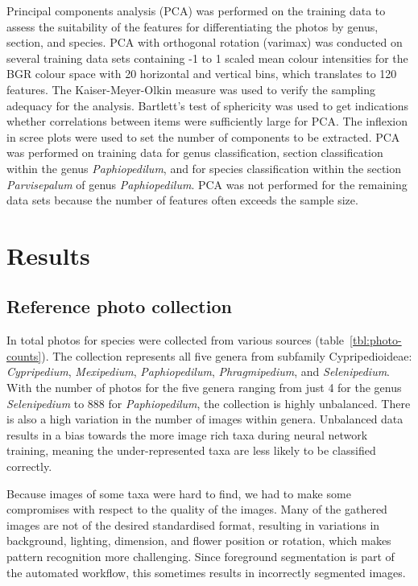 \documentclass[twocolumn]{bmcart}
\begin{document}
Principal components analysis (PCA) was performed on the training data to assess the suitability of the features for differentiating the photos by genus, section, and species. PCA with orthogonal rotation (varimax) was conducted on several training data sets containing -1 to 1 scaled mean colour intensities for the BGR colour space with 20 horizontal and vertical bins, which translates to 120 features. The Kaiser-Meyer-Olkin measure was used to verify the sampling adequacy for the analysis. Bartlett's test of sphericity was used to get indications whether correlations between items were sufficiently large for PCA. The inflexion in scree plots were used to set the number of components to be extracted. PCA was performed on training data for genus classification, section classification within the genus \textit{Paphiopedilum}, and for species classification within the section \textit{Parvisepalum} of genus \textit{Paphiopedilum}. PCA was not performed for the remaining data sets because the number of features often exceeds the sample size.

\section{Results}
\label{sec:results}

\subsection{Reference photo collection}

In total {\PhotoCount} photos for {\SpeciesCount} species were collected from various sources (table~\ref{tbl:photo-counts}). The collection represents all five genera from subfamily Cypripedioideae: \textit{Cypripedium}, \textit{Mexipedium}, \textit{Paphiopedilum}, \textit{Phragmipedium}, and \textit{Selenipedium}. With the number of photos for the five genera ranging from just 4 for the genus \textit{Selenipedium} to 888 for \textit{Paphiopedilum}, the collection is highly unbalanced. There is also a high variation in the number of images within genera. Unbalanced data results in a bias towards the more image rich taxa during neural network training, meaning the under-represented taxa are less likely to be classified correctly.

Because images of some taxa were hard to find, we had to make some compromises with respect to the quality of the images. Many of the gathered images are not of the desired standardised format, resulting in variations in background, lighting, dimension, and flower position or rotation, which makes pattern recognition more challenging. Since foreground segmentation is part of the automated workflow, this sometimes results in incorrectly segmented images.
\end{document}
